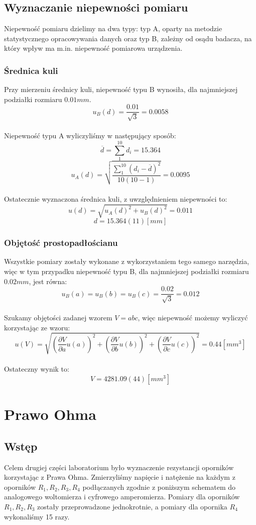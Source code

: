 \documentclass{article}
\begin{document}
\subsection{Wyznaczanie niepewności pomiaru}

Niepewność pomiaru dzielimy na dwa typy: typ A, oparty na metodzie statystycznego opracowywania danych oraz typ B, zależny od osądu badacza, na który wpływ ma m.in. niepewność pomiarowa urządzenia.

\subsubsection{Średnica kuli}
Przy mierzeniu średnicy kuli, niepewność typu B wynosiła, dla najmniejszej podziałki rozmiaru $0.01mm$.
$$ u_B(d) = \frac{0.01}{\sqrt{3}} = 0.0058 $$ 
\\
Niepewność typu A wyliczyliśmy w następujący sposób:
$$ \overline{d} = \sum_1^{10} d_i = 15.364 $$
$$ u_A(d) = \sqrt{ \frac{\sum_1^{10} (d_i - \overline{d})^2 }{10 (10-1)}} = 0.0095 $$
\\
Ostatecznie wyznaczona średnica kuli, z uwzględnieniem niepewności to:
$$ u(d) = \sqrt{u_A(d)^2 + u_B(d)^2} = 0.011 $$
$$ d = 15.364(11) [mm] $$ 

\subsubsection{Objętość prostopadłościanu}
Wszystkie pomiary zostały wykonane z wykorzystaniem tego samego narzędzia, więc w tym przypadku niepewność typu B, dla najmniejszej podziałki rozmiaru $0.02mm$, jest równa:
$$ u_B(a) = u_B(b) = u_B(c) = \frac{0.02}{\sqrt{3}} = 0.012 $$
\\
Szukamy objętości zadanej wzorem $ V = a b c$, więc niepewność możemy wyliczyć korzystając ze wzoru:
$$ u(V) = \sqrt{
    \left(\frac{\partial V}{\partial a}u(a)\right)^2 
    + \left(\frac{\partial V}{\partial b}u(b)\right)^2
    + \left(\frac{\partial V}{\partial c}u(c)\right)^2
} = 0.44 [mm^3] $$
\\
Ostateczny wynik to:
$$ V = 4281.09(44) [mm^3] $$

\clearpage

\section{Prawo Ohma}

\subsection{Wstęp}
Celem drugiej części laboratorium było wyznaczenie rezystancji oporników korzystając z Prawa Ohma. Zmierzyliśmy napięcie i natężenie na każdym z oporników $ R_1, R_2, R_3, R_4 $ podłączanych zgodnie z poniższym schematem do analogowego woltomierza i cyfrowego amperomierza. Pomiary dla oporników $ R_1, R_2, R_3 $ zostały przeprowadzone jednokrotnie, a pomiary dla opornika $ R_4 $ wykonaliśmy 15 razy.
\end{document}
